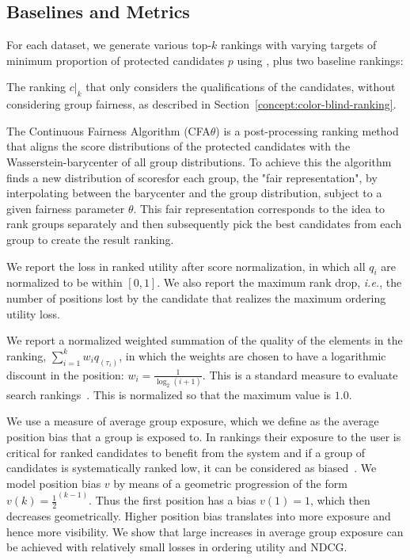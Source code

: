 \subsection{Baselines and Metrics}\label{sec:experiments-baselines}

For each dataset, we generate various top-$k$ rankings with varying targets of minimum proportion of protected candidates $p$ using \algoFAIR, plus two baseline rankings:

 The ranking $c|_k$ that only considers the qualifications of the candidates, without considering group fairness, as described in Section~\ref{concept:color-blind-ranking}.

 The Continuous Fairness Algorithm (CFA$\theta$) is a post-processing ranking method that aligns the score distributions of the protected candidates with the Wasserstein-barycenter of all group distributions.
%
To achieve this the algorithm finds a new distribution of scoresfor each group, the "fair representation", by interpolating between the barycenter and the group distribution, subject to a given fairness parameter $\theta$.
%
This fair representation corresponds to the idea to rank groups separately and then subsequently pick the best candidates from each group to create the result ranking. 

 We report the loss in ranked utility after score normalization, in which all $q_i$ are normalized to be within $[0, 1]$.
%
We also report the maximum rank drop, {\em i.e.}, the number of positions lost by the candidate that realizes the maximum ordering utility loss.

%
We report a normalized weighted summation of the quality of the elements in the ranking, $\sum_{i=1}^{k} w_i q_{(\tau_i)}$, in which the weights are chosen to have a logarithmic discount in the position:  $w_i = \frac{1}{\log_2 (i+1)}$. This is a standard measure to evaluate search rankings~\cite{jarvelin2002cumulated}.
%
This is normalized so that the maximum value is $1.0$.

 We use a measure of average group exposure, which we define as the average position bias that a group is exposed to. 
%
In rankings their exposure to the user is critical for ranked candidates to benefit from the system and if a group of candidates is systematically ranked low, it can be considered as biased~\cite{friedman1996bias}. 
%
We model position bias $v$ by means of a geometric progression of the form $v(k) = \frac{1}{2}^{(k-1)}$. 
%
Thus the first position has a bias $v(1)=1$, which then decreases geometrically.
%
Higher position bias translates into more exposure and hence more visibility.
%
We show that large increases in average group exposure can be achieved with relatively small losses in ordering utility and NDCG.


